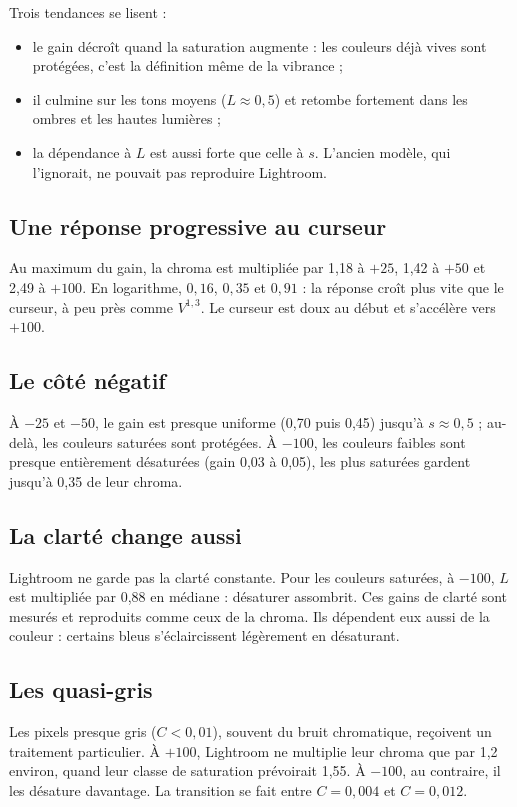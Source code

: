 Trois tendances se lisent :
\begin{itemize}
\item le gain décroît quand la saturation augmente : les couleurs déjà vives
sont protégées, c'est la définition même de la vibrance ;
\item il culmine sur les tons moyens ($L\approx0{,}5$) et retombe fortement
dans les ombres et les hautes lumières ;
\item la dépendance à $L$ est aussi forte que celle à $s$. L'ancien modèle, qui
l'ignorait, ne pouvait pas reproduire Lightroom.
\end{itemize}

\subsection{Une réponse progressive au curseur}
Au maximum du gain, la chroma est multipliée par 1,18 à $+25$, 1,42 à $+50$ et
2,49 à $+100$. En logarithme, $0{,}16$, $0{,}35$ et $0{,}91$ : la réponse
croît plus vite que le curseur, à peu près comme $V^{1{,}3}$. Le curseur est
doux au début et s'accélère vers $+100$.

\subsection{Le côté négatif}
À $-25$ et $-50$, le gain est presque uniforme (0,70 puis 0,45) jusqu'à
$s\approx0{,}5$ ; au-delà, les couleurs saturées sont protégées. À $-100$, les
couleurs faibles sont presque entièrement désaturées (gain 0,03 à 0,05), les
plus saturées gardent jusqu'à 0,35 de leur chroma.

\subsection{La clarté change aussi}
Lightroom ne garde pas la clarté constante. Pour les couleurs saturées, à
$-100$, $L$ est multipliée par 0,88 en médiane : désaturer assombrit. Ces
gains de clarté sont mesurés et reproduits comme ceux de la chroma. Ils
dépendent eux aussi de la couleur : certains bleus s'éclaircissent légèrement
en désaturant.

\subsection{Les quasi-gris}
\label{sec:quasigris}
Les pixels presque gris ($C<0{,}01$), souvent du bruit chromatique, reçoivent un
traitement particulier. À $+100$, Lightroom ne multiplie leur chroma que par
1,2 environ, quand leur classe de saturation prévoirait 1,55. À $-100$, au
contraire, il les désature davantage. La transition se fait entre $C=0{,}004$
et $C=0{,}012$.

